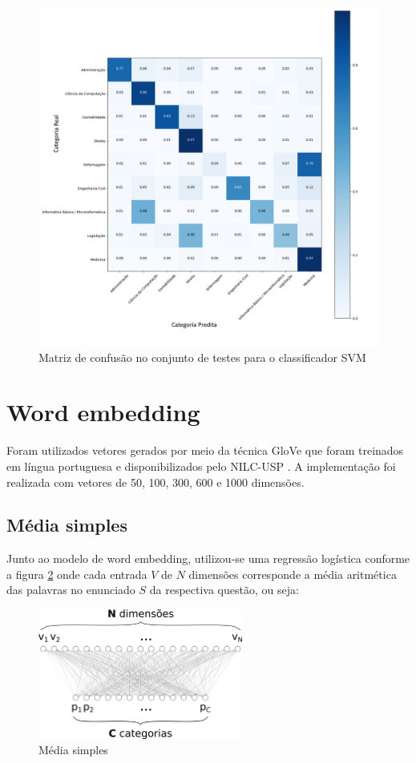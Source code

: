 \begin{figure}[!ht]
	\centering
	\includegraphics[width=1.1\textwidth]{figures/SVM_Confusion_matrix_normalized.png}
	\caption{Matriz de confusão no conjunto de testes para o classificador SVM}
	\label{fig:confusion_matrix_SVM}
\end{figure}

\section{Word embedding} \label{We_implementation}
Foram utilizados vetores gerados por meio da técnica GloVe \citep{pennington2014glove} que foram treinados em língua portuguesa e disponibilizados pelo NILC-USP \citep{DBLP:journals/corr/Ruder16}. A implementação foi realizada com vetores de 50, 100, 300, 600 e 1000 dimensões.

\subsection{Média simples}
Junto ao modelo de word embedding, utilizou-se uma regressão logística conforme a figura \ref{fig:simple_avg} onde cada entrada $V$ de $N$ dimensões corresponde a média aritmética das palavras no enunciado $S$ da respectiva questão, ou seja:

\begin{figure}[!ht]
	\centering
	\includegraphics[width=0.6\textwidth]{figures/simple_avg.png}
	\caption{Média simples}
	\label{fig:simple_avg}
\end{figure}

